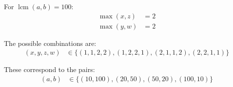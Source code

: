 \documentclass[12pt]{article}
\begin{document}
For $\operatorname{lcm}(a, b) = 100$:
\begin{align*}
    \max(x, z) &= 2 \\
    \max(y, w) &= 2
\end{align*}

The possible combinations are:
\begin{align*}
    (x, y, z, w) &\in \{(1, 1, 2, 2), (1, 2, 2, 1), (2, 1, 1, 2), (2, 2, 1, 1)\}
\end{align*}

These correspond to the pairs:
\begin{align*}
    (a, b) &\in \{(10, 100), (20, 50), (50, 20), (100, 10)\}
\end{align*}
\end{document}
